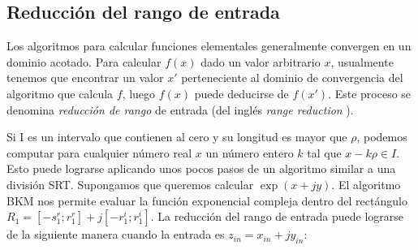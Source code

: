 \documentclass[10pt,a4paper]{book}
\begin{document}
   \subsection{Reducción del rango de entrada}


   Los algoritmos para calcular funciones elementales generalmente convergen en un dominio acotado. Para calcular $f(x)$ dado un valor arbitrario $x$, usualmente tenemos que encontrar un valor $x'$ perteneciente al dominio de convergencia del algoritmo que calcula $f$, luego $f(x)$ puede deducirse de $f(x')$. Este proceso se denomina \textit{reducción de rango} de entrada (del inglés \textit{range reduction} ).

   Si I es un intervalo que contienen al cero y su longitud es mayor que $\rho$, podemos computar para cualquier número real $x$ un número entero $k$ tal que $x-k\rho \in I$. Esto puede lograrse aplicando unos pocos pasos de un algoritmo similar a una división SRT. Supongamos que queremos calcular  $\exp(x+jy)$. El algoritmo BKM nos permite evaluar la función exponencial compleja dentro del rectángulo $R_1 = [-s_1^r; r_1^r] + j [-r_1^i; r_1^i]$.
   La reducción del rango de entrada puede lograrse de la siguiente manera cuando la entrada es $z_{in} = x_{in} + j y_{in}$:
\end{document}
